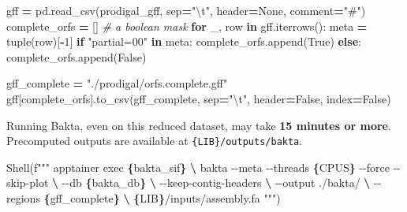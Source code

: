 \documentclass[
]{book}
\newenvironment{Shaded}{\begin{snugshade}}{\end{snugshade}}
\newcommand{\BuiltInTok}[1]{#1}
\newcommand{\CharTok}[1]{\textcolor[rgb]{0.31,0.60,0.02}{#1}}
\newcommand{\CommentTok}[1]{\textcolor[rgb]{0.56,0.35,0.01}{\textit{#1}}}
\newcommand{\ControlFlowTok}[1]{\textcolor[rgb]{0.13,0.29,0.53}{\textbf{#1}}}
\newcommand{\DecValTok}[1]{\textcolor[rgb]{0.00,0.00,0.81}{#1}}
\newcommand{\KeywordTok}[1]{\textcolor[rgb]{0.13,0.29,0.53}{\textbf{#1}}}
\newcommand{\NormalTok}[1]{#1}
\newcommand{\OperatorTok}[1]{\textcolor[rgb]{0.81,0.36,0.00}{\textbf{#1}}}
\newcommand{\SpecialCharTok}[1]{\textcolor[rgb]{0.81,0.36,0.00}{\textbf{#1}}}
\newcommand{\SpecialStringTok}[1]{\textcolor[rgb]{0.31,0.60,0.02}{#1}}
\newcommand{\StringTok}[1]{\textcolor[rgb]{0.31,0.60,0.02}{#1}}
\newcommand{\VariableTok}[1]{\textcolor[rgb]{0.00,0.00,0.00}{#1}}
\begin{document}
\begin{Shaded}
\begin{Highlighting}[numbers=left,,]
\NormalTok{gff }\OperatorTok{=}\NormalTok{ pd.read\_csv(prodigal\_gff, sep}\OperatorTok{=}\StringTok{"}\CharTok{\textbackslash{}t}\StringTok{"}\NormalTok{, header}\OperatorTok{=}\VariableTok{None}\NormalTok{, comment}\OperatorTok{=}\StringTok{"\#"}\NormalTok{)}
\NormalTok{complete\_orfs }\OperatorTok{=}\NormalTok{ [] }\CommentTok{\# a boolean mask}
\ControlFlowTok{for}\NormalTok{ \_, row }\KeywordTok{in}\NormalTok{ gff.iterrows():}
\NormalTok{    meta }\OperatorTok{=} \BuiltInTok{tuple}\NormalTok{(row)[}\OperatorTok{{-}}\DecValTok{1}\NormalTok{]}
    \ControlFlowTok{if} \StringTok{"partial=00"} \KeywordTok{in}\NormalTok{ meta:}
\NormalTok{        complete\_orfs.append(}\VariableTok{True}\NormalTok{)}
    \ControlFlowTok{else}\NormalTok{:}
\NormalTok{        complete\_orfs.append(}\VariableTok{False}\NormalTok{)}

\NormalTok{gff\_complete }\OperatorTok{=} \StringTok{"./prodigal/orfs.complete.gff"}
\NormalTok{gff[complete\_orfs].to\_csv(gff\_complete, sep}\OperatorTok{=}\StringTok{"}\CharTok{\textbackslash{}t}\StringTok{"}\NormalTok{, header}\OperatorTok{=}\VariableTok{False}\NormalTok{, index}\OperatorTok{=}\VariableTok{False}\NormalTok{)}
\end{Highlighting}
\end{Shaded}

Running Bakta, even on this reduced dataset, may take \textbf{15 minutes or more}. Precomputed outputs are available at \texttt{\{LIB\}/outputs/bakta}.

\begin{Shaded}
\begin{Highlighting}[numbers=left,,]
\NormalTok{Shell(}\SpecialStringTok{f"""}
\SpecialStringTok{apptainer exec }\SpecialCharTok{\{}\NormalTok{bakta\_sif}\SpecialCharTok{\}}\SpecialStringTok{ }\OperatorTok{\textbackslash{}}
\SpecialStringTok{    bakta {-}{-}meta {-}{-}threads }\SpecialCharTok{\{}\NormalTok{CPUS}\SpecialCharTok{\}}\SpecialStringTok{ {-}{-}force {-}{-}skip{-}plot }\OperatorTok{\textbackslash{}}
\SpecialStringTok{        {-}{-}db }\SpecialCharTok{\{}\NormalTok{bakta\_db}\SpecialCharTok{\}}\SpecialStringTok{ }\OperatorTok{\textbackslash{}}
\SpecialStringTok{        {-}{-}keep{-}contig{-}headers }\OperatorTok{\textbackslash{}}
\SpecialStringTok{        {-}{-}output ./bakta/ }\OperatorTok{\textbackslash{}}
\SpecialStringTok{        {-}{-}regions }\SpecialCharTok{\{}\NormalTok{gff\_complete}\SpecialCharTok{\}}\SpecialStringTok{ }\OperatorTok{\textbackslash{}}
\SpecialStringTok{        }\SpecialCharTok{\{}\NormalTok{LIB}\SpecialCharTok{\}}\SpecialStringTok{/inputs/assembly.fa}
\SpecialStringTok{"""}\NormalTok{)}
\end{Highlighting}
\end{Shaded}
\end{document}
